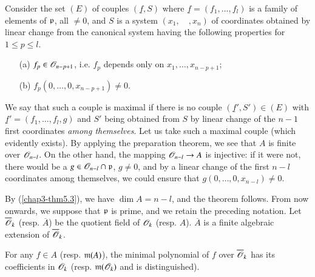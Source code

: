 Consider the set $(E)$ of couples $(\underline{f},S)$ where $\underline{f}=(f_{1},\ldots,f_{l})$ is a family of elements of $\mathfrak{p}$, all $\neq 0$, and $S$ is a system $(x_{1},\quad,x_{n})$ of coordinates obtained by linear change from the canonical system having the following properties for $1\leq p\leq l$.
\begin{itemize}
\item[(a)] $f_{p}\in \mathscr{O}_{n-p+1}$, i.e. $f_{p}$ depends only on $x_{1},\ldots,x_{n-p+1}$; 

\item[(b)] $f_{p}(0,\ldots,0,x_{n-p+1})\neq 0$.
\end{itemize}
We say that such a couple is maximal if there is no couple $(\underline{f}',S')\in (E)$ with $\underline{f}'=(f_{1},\ldots,f_{l},g)$ and $S'$ being obtained from $S$ by linear change of the $n-1$ first coordinates {\em among themselves}. Let us take such a maximal couple (which evidently exists). By applying the preparation theorem, we see that $A$ is finite over $\mathscr{O}_{n-l}$. On the other hand, the mapping $\mathscr{O}_{n-l}\to A$ is injective: if it were not, there would be a $g\in \mathscr{O}_{n-l}\cap \mathfrak{p}$, $g\neq 0$, and by a linear change of the first $n-l$ coordinates among themselves, we could ensure that $g(0,\ldots,0,x_{n-l})\neq 0$.

By (\ref{chap3-thm5.3}), we have $\dim A=n-l$, and the theorem follows. From now onwards, we suppose that $\mathfrak{p}$ is prime, and we retain the preceding notation. Let $\overline{\mathscr{O}}_{k}$ (resp. $\overline{A}$) be the quotient field of $\mathscr{O}_{k}$ (resp. $A$). $\overline{A}$ is a finite algebraic extension of $\overline{\mathscr{O}}_{k}$.

\begin{proposition}\label{chap3-prop5.6}
For any $f\in A$ (resp. $\mathfrak{m}(A)$), the minimal polynomial of $f$ over $\overline{\mathscr{O}}_{k}$ has its coefficients in $\mathscr{O}_{k}$ (resp. $\mathfrak{m}(\mathscr{O}_{k})$ and is distinguished).
\end{proposition}

